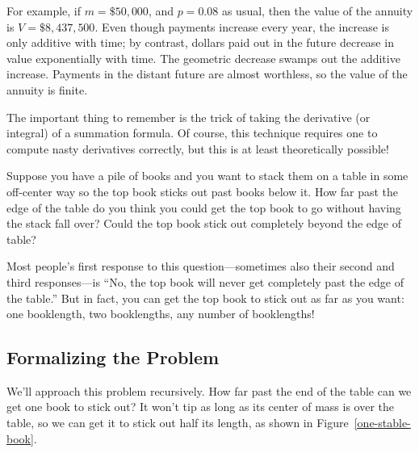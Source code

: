 \begin{editingnotes}
For example, if $m = \$50,000$, and $p = 0.08$ as usual, then the
value of the annuity is $V = \$8,437,500$.  Even though payments
increase every year, the increase is only additive with time; by
contrast, dollars paid out in the future decrease in value
exponentially with time.  The geometric decrease swamps out the
additive increase.  Payments in the distant future are almost
worthless, so the value of the annuity is finite.

The important thing to remember is the trick of taking the derivative
(or integral) of a summation formula.  Of course, this technique
requires one to compute nasty derivatives correctly, but this is at
least theoretically possible!

\end{editingnotes}

\begin{problems}

\classproblems
{}

\homeworkproblems
{}

\end{problems}

\label{book_stacking_sec}

Suppose you have a pile of books and you want to stack them on a table in
some off-center way so the top book sticks out past books below it.  How
far past the edge of the table do you think you could get the top book to
go without having the stack fall over?  Could the top book stick out
completely beyond the edge of table?

Most people's first response to this question---sometimes also their
second and third responses---is ``No, the top book will never get
completely past the edge of the table.''  But in fact, you can get the top
book to stick out as far as you want: one booklength, two booklengths, any
number of booklengths!

\subsection{Formalizing the Problem}

We'll approach this problem recursively.  How far past the end of the
table can we get one book to stick out?  It won't tip as long as its
center of mass is over the table, so we can get it to stick out half its
length, as shown in Figure~\ref{one-stable-book}.

